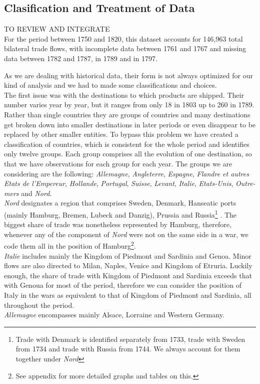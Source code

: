 \documentclass[12pt,a4paper,notitlepage,english]{article}
\begin{document}
\subsection{Clasification and Treatment of Data} \label{figures}
\begin{center}
TO REVIEW AND INTEGRATE \\
For the period between 1750 and 1820, this dataset accounts for 146,963 total bilateral trade flows, with incomplete data between 1761 and 1767 and missing data between 1782 and 1787, in 1789 and in 1797.
\end{center}
As we are dealing with historical data, their form is not always optimized for our kind of analysis and we had to made some classifications and choices.\\
The first issue was with the destinations to which products are shipped.
Their number varies year by year, but it ranges from only 18 in 1803 up to 260 in 1789.
Rather than single countries they are groups of countries and many destinations get broken down into smaller destinations in later periods or even disappear to be replaced by other smaller entities.
To bypass this problem we have created a classification of countries, which is consistent for the whole period and identifies only twelve groups.
Each group comprises all the evolution of one destination, so that we have observations for each group for each year.
The groups we are considering are the following: \textit{Allemagne}, \textit{Angleterre}, \textit{Espagne}, \textit{Flandre et autres Etats de l'Empereur}, \textit{Hollande}, \textit{Portugal}, \textit{Suisse}, \textit{Levant}, \textit{Italie},  \textit{Etats-Unis}, \textit{Outre-mers} and \textit{Nord}. \\
\textit{Nord} designates a region that comprises Sweden, Denmark, Hanseatic ports (mainly Hamburg, Bremen, Lubeck and Danzig), Prussia and Russia\footnote{Trade with Denmark is identified separately from 1733, trade with Sweden from 1734 and trade with Russia from 1744.
We always account for them together under \textit{Nord}} \citep{charles2018cross}.
The biggest share of trade was nonetheless represented by Hamburg, therefore, whenever any of the component of \textit{Nord} were not on the same side in a war, we code them all in the position of Hamburg\footnote{See appendix for more detailed graphs and tables on this.}. \\
\textit{Italie} includes mainly the Kingdom of Piedmont and Sardinia and Genoa.
Minor flows are also directed to Milan, Naples, Venice and Kingdom of Etruria.
Luckily enough, the share of trade with Kingdom of Piedmont and Sardinia exceeds that with Genoua for most of the period, therefore we can consider the position of Italy in the wars as equivalent to that of Kingdom of Piedmont and Sardinia, all throughout the period.\\
\textit{Allemagne} encompasses mainly Alsace, Lorraine and Western Germany.
\end{document}
